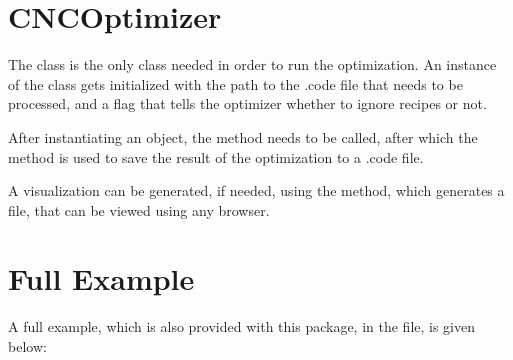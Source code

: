 \documentclass[letterpaper,10pt,english,openany,oneside]{sphinxmanual}
\begin{document}
\section{CNCOptimizer}
\label{\detokenize{usage:cncoptimizer}}
The  class is the only class needed in order to run the
optimization. An instance of the class gets initialized with the path to the
.code file that needs to be processed, and a flag that tells the optimizer
whether to ignore recipes or not.

After instantiating an  object, the  method needs to
be called, after which the  method is used to save the result of the
optimization to a .code file.

A visualization can be generated, if needed, using the  method,
which generates a  file, that can be viewed using any browser.


\section{Full Example}
\label{\detokenize{usage:full-example}}
A full example, which is also provided with this package, in the 
file, is given below:

%
\begin{sphinxVerbatim}[commandchars=\\\{\}]
   

  

   



\end{sphinxVerbatim}
\end{document}
